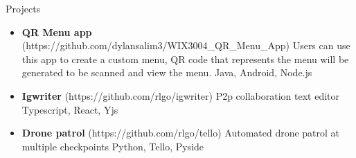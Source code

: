 \documentclass[]{mcdowellcv}
\begin{document}
\begin{cvsection}{Projects}
	\begin{cvsubsection}{}{}{}
		\begin{itemize}
			\setlength\itemsep{3pt}
			\item \textbf{QR Menu app} (https://github.com/dylansalim3/WIX3004\_QR\_Menu\_App)  Users can use this app to create a custom menu, QR code that represents the menu will be generated to be scanned and view the menu. Java, Android, Node.js
			\item \textbf{Igwriter} (https://github.com/rlgo/igwriter)  P2p collaboration text editor Typescript, React, Yjs
			\item \textbf{Drone patrol} (https://github.com/rlgo/tello)  Automated drone patrol at multiple checkpoints Python, Tello, Pyside
		\end{itemize}
	\end{cvsubsection}
\end{cvsection}

\
\end{document}
